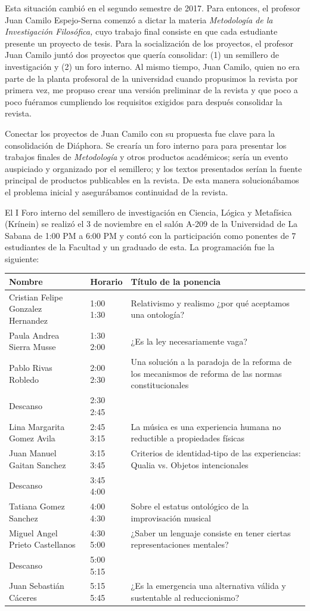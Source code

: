 \documentclass[]{book}
\begin{document}
Esta situación cambió en el segundo semestre de 2017. Para entonces, el
profesor Juan Camilo Espejo-Serna comenzó a dictar la materia
\emph{Metodología de la Investigación Filosófica,} cuyo trabajo final
consiste en que cada estudiante presente un proyecto de tesis. Para la
socialización de los proyectos, el profesor Juan Camilo juntó dos
proyectos que quería consolidar: (1) un semillero de investigación y (2)
un foro interno. Al mismo tiempo, Juan Camilo, quien no era parte de la
planta profesoral de la universidad cuando propusimos la revista por
primera vez, me propuso crear una versión preliminar de la revista y que
poco a poco fuéramos cumpliendo los requisitos exigidos para después
consolidar la revista.

Conectar los proyectos de Juan Camilo con su propuesta fue clave para la
consolidación de Diáphora. Se crearía un foro interno para para
presentar los trabajos finales de \emph{Metodología} y otros productos
académicos; sería un evento auspiciado y organizado por el semillero; y
los textos presentados serían la fuente principal de productos
publicables en la revista. De esta manera solucionábamos el problema
inicial y asegurábamos continuidad de la revista.

El I Foro interno del semillero de investigación en Ciencia, Lógica y
Metafísica (Krínein) se realizó el 3 de noviembre en el salón A-209 de
la Universidad de La Sabana de 1:00 PM a 6:00 PM y contó con la
participación como ponentes de 7 estudiantes de la Facultad y un
graduado de esta. La programación fue la siguiente:

\begin{longtable}[]{@{}lll@{}}
\toprule
\textbf{Nombre} & \textbf{Horario} & \textbf{Título de la
ponencia}\tabularnewline
\midrule
\endhead
Cristian Felipe Gonzalez Hernandez & 1:00 1:30 & Relativismo y realismo
¿por qué aceptamos una ontología?\tabularnewline
Paula Andrea Sierra Musse & 1:30 2:00 & ¿Es la ley necesariamente
vaga?\tabularnewline
Pablo Rivas Robledo & 2:00 2:30 & Una solución a la paradoja de la
reforma de los mecanismos de reforma de las normas
constitucionales\tabularnewline
Descanso & 2:30 2:45 &\tabularnewline
Lina Margarita Gomez Avila & 2:45 3:15 & La música es una experiencia
humana no reductible a propiedades físicas\tabularnewline
Juan Manuel Gaitan Sanchez & 3:15 3:45 & Criterios de identidad-tipo de
las experiencias: Qualia vs. Objetos intencionales\tabularnewline
Descanso & 3:45 4:00 &\tabularnewline
Tatiana Gomez Sanchez & 4:00 4:30 & Sobre el estatus ontológico de la improvisación musical\tabularnewline
Miguel Angel Prieto Castellanos & 4:30 5:00 &
\protect\hypertarget{_Hlk508741912}{}{}¿Saber un lenguaje consiste en
tener ciertas representaciones mentales?\tabularnewline
Descanso & 5:00 5:15 &\tabularnewline
Juan Sebastián Cáceres & 5:15 5:45 &
\protect\hypertarget{_Hlk508743682}{}{}¿Es la emergencia una alternativa
válida y sustentable al reduccionismo?\tabularnewline
\bottomrule
\end{longtable}
\end{document}
